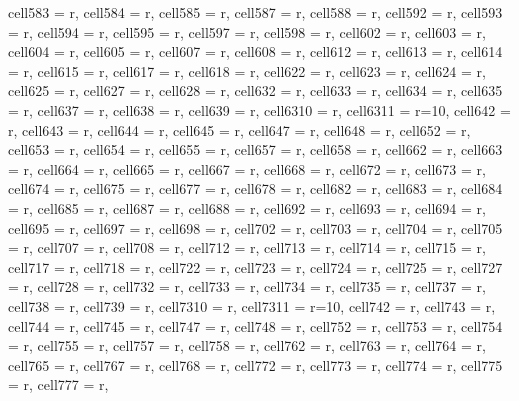 \begin{longtblr}[
  caption = {Linear model estimating all the considered metrics in every alternative scenario.},
  label = {tab:appendix_LCBM_all_metrics_all_scenarios}
]
{  cell{58}{3} = {r},
  cell{58}{4} = {r},
  cell{58}{5} = {r},
  cell{58}{7} = {r},
  cell{58}{8} = {r},
  cell{59}{2} = {r},
  cell{59}{3} = {r},
  cell{59}{4} = {r},
  cell{59}{5} = {r},
  cell{59}{7} = {r},
  cell{59}{8} = {r},
  cell{60}{2} = {r},
  cell{60}{3} = {r},
  cell{60}{4} = {r},
  cell{60}{5} = {r},
  cell{60}{7} = {r},
  cell{60}{8} = {r},
  cell{61}{2} = {r},
  cell{61}{3} = {r},
  cell{61}{4} = {r},
  cell{61}{5} = {r},
  cell{61}{7} = {r},
  cell{61}{8} = {r},
  cell{62}{2} = {r},
  cell{62}{3} = {r},
  cell{62}{4} = {r},
  cell{62}{5} = {r},
  cell{62}{7} = {r},
  cell{62}{8} = {r},
  cell{63}{2} = {r},
  cell{63}{3} = {r},
  cell{63}{4} = {r},
  cell{63}{5} = {r},
  cell{63}{7} = {r},
  cell{63}{8} = {r},
  cell{63}{9} = {r},
  cell{63}{10} = {r},
  cell{63}{11} = {r=10}{},
  cell{64}{2} = {r},
  cell{64}{3} = {r},
  cell{64}{4} = {r},
  cell{64}{5} = {r},
  cell{64}{7} = {r},
  cell{64}{8} = {r},
  cell{65}{2} = {r},
  cell{65}{3} = {r},
  cell{65}{4} = {r},
  cell{65}{5} = {r},
  cell{65}{7} = {r},
  cell{65}{8} = {r},
  cell{66}{2} = {r},
  cell{66}{3} = {r},
  cell{66}{4} = {r},
  cell{66}{5} = {r},
  cell{66}{7} = {r},
  cell{66}{8} = {r},
  cell{67}{2} = {r},
  cell{67}{3} = {r},
  cell{67}{4} = {r},
  cell{67}{5} = {r},
  cell{67}{7} = {r},
  cell{67}{8} = {r},
  cell{68}{2} = {r},
  cell{68}{3} = {r},
  cell{68}{4} = {r},
  cell{68}{5} = {r},
  cell{68}{7} = {r},
  cell{68}{8} = {r},
  cell{69}{2} = {r},
  cell{69}{3} = {r},
  cell{69}{4} = {r},
  cell{69}{5} = {r},
  cell{69}{7} = {r},
  cell{69}{8} = {r},
  cell{70}{2} = {r},
  cell{70}{3} = {r},
  cell{70}{4} = {r},
  cell{70}{5} = {r},
  cell{70}{7} = {r},
  cell{70}{8} = {r},
  cell{71}{2} = {r},
  cell{71}{3} = {r},
  cell{71}{4} = {r},
  cell{71}{5} = {r},
  cell{71}{7} = {r},
  cell{71}{8} = {r},
  cell{72}{2} = {r},
  cell{72}{3} = {r},
  cell{72}{4} = {r},
  cell{72}{5} = {r},
  cell{72}{7} = {r},
  cell{72}{8} = {r},
  cell{73}{2} = {r},
  cell{73}{3} = {r},
  cell{73}{4} = {r},
  cell{73}{5} = {r},
  cell{73}{7} = {r},
  cell{73}{8} = {r},
  cell{73}{9} = {r},
  cell{73}{10} = {r},
  cell{73}{11} = {r=10}{},
  cell{74}{2} = {r},
  cell{74}{3} = {r},
  cell{74}{4} = {r},
  cell{74}{5} = {r},
  cell{74}{7} = {r},
  cell{74}{8} = {r},
  cell{75}{2} = {r},
  cell{75}{3} = {r},
  cell{75}{4} = {r},
  cell{75}{5} = {r},
  cell{75}{7} = {r},
  cell{75}{8} = {r},
  cell{76}{2} = {r},
  cell{76}{3} = {r},
  cell{76}{4} = {r},
  cell{76}{5} = {r},
  cell{76}{7} = {r},
  cell{76}{8} = {r},
  cell{77}{2} = {r},
  cell{77}{3} = {r},
  cell{77}{4} = {r},
  cell{77}{5} = {r},
  cell{77}{7} = {r},
}
\end{longtblr}
